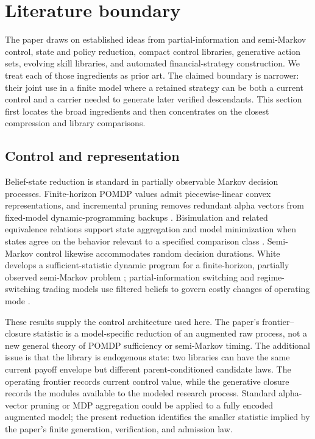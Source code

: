 \section{Literature boundary}\label{sec:literature-boundary}

The paper draws on established ideas from partial-information and semi-Markov
control, state and policy reduction, compact control libraries, generative
action sets, evolving skill libraries, and automated financial-strategy
construction.  We treat each of those ingredients as prior art.  The claimed
boundary is narrower: their joint use in a finite model where a retained
strategy can be both a current control and a carrier needed to generate later
verified descendants.  This section first locates the broad ingredients and
then concentrates on the closest compression and library comparisons.

\subsection{Control and representation}

Belief-state reduction is standard in partially observable Markov decision
processes.  Finite-horizon POMDP values admit piecewise-linear convex
representations, and incremental pruning removes redundant alpha vectors from
fixed-model dynamic-programming backups
\cite{SmallwoodSondik1973,CassandraLittmanZhang1997}.  Bisimulation and related
equivalence relations support state aggregation and model minimization when
states agree on the behavior relevant to a specified comparison class
\cite{GivanDeanGreig2003}.  Semi-Markov control likewise accommodates random
decision durations.  White develops a sufficient-statistic dynamic program
for a finite-horizon, partially observed semi-Markov problem
\cite{White1976}; partial-information switching and regime-switching trading
models use filtered beliefs to govern costly changes of operating mode
\cite{LiNystromOlofsson2015,DaiZhangZhu2010}.

These results supply the control architecture used here.  The paper's
frontier--closure statistic is a model-specific reduction of an augmented raw
process, not a new general theory of POMDP sufficiency or semi-Markov timing.
The additional issue is that the library is endogenous state: two libraries
can have the same current payoff envelope but different parent-conditioned
candidate laws.  The operating frontier records current control value, while
the generative closure records the modules available to the modeled research
process.  Standard alpha-vector pruning or MDP aggregation could be applied to
a fully encoded augmented model; the present reduction identifies the smaller
statistic implied by the paper's finite generation, verification, and
admission law.

